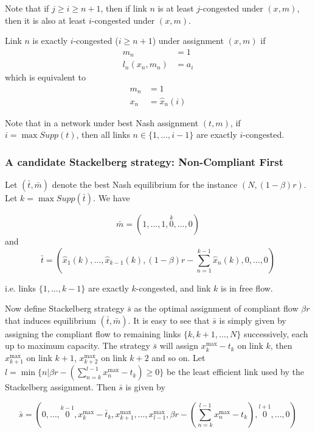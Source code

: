 Note that if $j \geq i \geq n+1$, then if link $n$ is at least $j$-congested under $(x, m)$, then it is also at least $i$-congested under $(x,m)$.

\begin{definition}
Link $n$ is exactly $i$-congested ($i \geq n+1$) under assignment $(x, m)$ if
\begin{align*}
m_n &= 1 \\
l_n(x_n, m_n) &= a_i
\end{align*}
which is equivalent to 
\begin{align*}
m_n &= 1 \\
x_n &= \hat{x}_n(i)
\end{align*}
\end{definition}

Note that in a network under best Nash assignment $(t, m)$, if $i = \max Supp(t)$, then all links $n \in \{1, \dots, i-1\}$ are exactly $i$-congested.

\subsubsection{A candidate Stackelberg strategy: Non-Compliant First}
Let $(\bar{t}, \bar{m})$ denote the best Nash equilibrium for the instance $(N, (1-\beta)r)$. Let $k = \max Supp(\bar{t})$. We have

\[
\bar{m} = (1, \dots, 1, \stackrel{k}{0}, \dots, 0)
\]
and
\[
\bar{t} = \left( 
\hat{x}_1(k), \dots, \hat{x}_{k - 1}(k), 
(1 - \beta)r - \sum_{n = 1}^{k - 1} \hat{x}_n(k), 
0, \dots, 0 \right)
\]

i.e. links $\{1, \dots, k-1 \}$ are exactly $k$-congested, and link $k$ is in free flow.

Now define Stackelberg strategy $\bar{s}$ as the optimal assignment of compliant flow $\beta r$ that induces equilibrium $(\bar{t}, \bar{m})$. It is easy to see that $\bar{s}$ is simply given by assigning the compliant flow to remaining links $\{k, k + 1, \dots, N\}$ successively, each up to maximum capacity. 
The strategy $\bar{s}$ will assign $x^{\max}_{k} - t_{k}$ on link $k$, then $x_{k + 1}^{\max}$ on link $k + 1$, $x_{k+2}^{\max}$ on link $k+2$ and so on.
Let $l = \min \{n | \beta r - (\sum_{n = k}^{l-1}x^{\max}_n - t_{k}) \geq 0 \}$ be the least efficient link used by the Stackelberg assignment. Then $\bar{s}$ is given by

\[
\bar{s} = \left(0, \dots, \stackrel{k-1}{0}, 
x_{k}^{\max} - \bar{t}_{k}, 
x_{k+1}^{\max}, \dots,  x_{l-1}^{\max}, 
\beta r - (\sum_{n = k}^{l-1}x_n^{\max} - t_{k}), 
\stackrel{l+1}{0}, \dots, 0 \right)
\]

